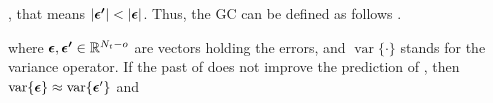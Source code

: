 , that means $|\ve{\epsilon'}|<|\ve{\epsilon}|$. Thus, the GC can be defined as follows \cite{rezaei2023classification}.

where $\bm {\epsilon}, \bm {\epsilon'} \in \mathbb{R}^{N_t-o}$ are vectors holding the  errors, and $\operatorname{var}\{\cdot\}$ stands for the variance operator. If the past of  does not improve the prediction of , then $\operatorname{var}\{\bm {\epsilon}\} \approx \operatorname{var}\{\bm {\epsilon}'\}$ and 

